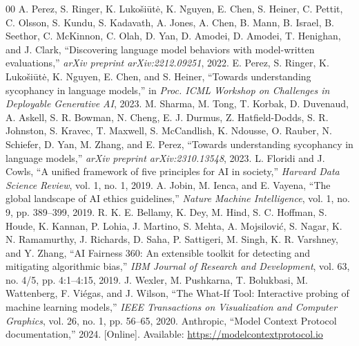 \documentclass[conference]{IEEEtran}
\begin{document}
\begin{thebibliography}{00}
 A. Perez, S. Ringer, K. Luko\v{s}i\={u}t\.{e}, K. Nguyen, E. Chen, S. Heiner, C. Pettit, C. Olsson, S. Kundu, S. Kadavath, A. Jones, A. Chen, B. Mann, B. Israel, B. Seethor, C. McKinnon, C. Olah, D. Yan, D. Amodei, D. Amodei, T. Henighan, and J. Clark, ``Discovering language model behaviors with model-written evaluations,'' \textit{arXiv preprint arXiv:2212.09251}, 2022.
 E. Perez, S. Ringer, K. Luko\v{s}i\={u}t\.{e}, K. Nguyen, E. Chen, and S. Heiner, ``Towards understanding sycophancy in language models,'' in \textit{Proc. ICML Workshop on Challenges in Deployable Generative AI}, 2023.
 M. Sharma, M. Tong, T. Korbak, D. Duvenaud, A. Askell, S. R. Bowman, N. Cheng, E. J. Durmus, Z. Hatfield-Dodds, S. R. Johnston, S. Kravec, T. Maxwell, S. McCandlish, K. Ndousse, O. Rauber, N. Schiefer, D. Yan, M. Zhang, and E. Perez, ``Towards understanding sycophancy in language models,'' \textit{arXiv preprint arXiv:2310.13548}, 2023.
 L. Floridi and J. Cowls, ``A unified framework of five principles for AI in society,'' \textit{Harvard Data Science Review}, vol. 1, no. 1, 2019.
 A. Jobin, M. Ienca, and E. Vayena, ``The global landscape of AI ethics guidelines,'' \textit{Nature Machine Intelligence}, vol. 1, no. 9, pp. 389--399, 2019.
 R. K. E. Bellamy, K. Dey, M. Hind, S. C. Hoffman, S. Houde, K. Kannan, P. Lohia, J. Martino, S. Mehta, A. Mojsilovi\'{c}, S. Nagar, K. N. Ramamurthy, J. Richards, D. Saha, P. Sattigeri, M. Singh, K. R. Varshney, and Y. Zhang, ``AI Fairness 360: An extensible toolkit for detecting and mitigating algorithmic bias,'' \textit{IBM Journal of Research and Development}, vol. 63, no. 4/5, pp. 4:1--4:15, 2019.
 J. Wexler, M. Pushkarna, T. Bolukbasi, M. Wattenberg, F. Vi\'{e}gas, and J. Wilson, ``The What-If Tool: Interactive probing of machine learning models,'' \textit{IEEE Transactions on Visualization and Computer Graphics}, vol. 26, no. 1, pp. 56--65, 2020.
 Anthropic, ``Model Context Protocol documentation,'' 2024. [Online]. Available: \url{https://modelcontextprotocol.io}
\end{thebibliography}
\end{document}
